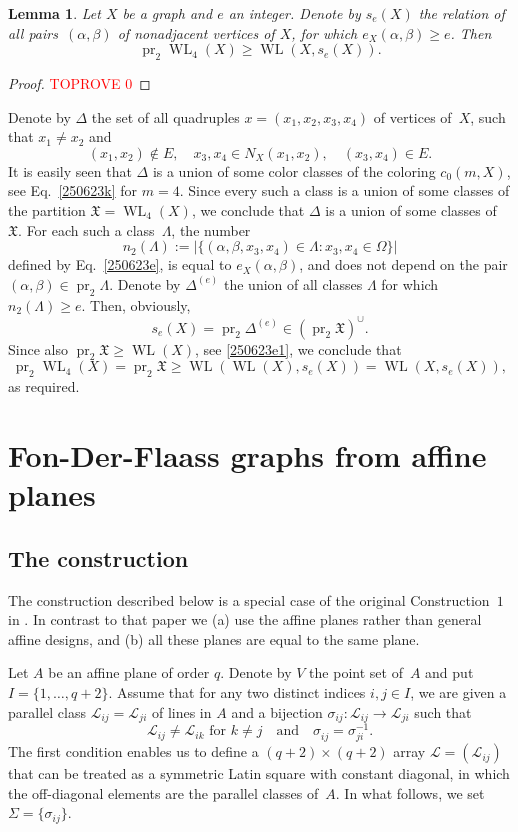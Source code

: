 \documentclass{amsart}
\newcommand{\cal}{\mathcal}
\newtheorem{lemma}[formula]{Lemma}
\def\qtnl#1{\begin{equation}\label{#1}}
\def\eqtn{\end{equation}}
\def\lmml#1{\begin{lemma}\label{#1}}
\def\elmm{\end{lemma}}
\def\prf{\begin{proof}\textcolor{red}{TOPROVE 0}\end{proof}}
\def\cL{{\cal L}}
\def\fX{{\mathfrak X}}
\DeclareMathOperator{\pr}{pr}
\DeclareMathOperator{\WL}{WL}
\def\qaq{\quad\text{and}\quad}
\begin{document}
\lmml{090623b}
Let $X$ be a graph  and $e$ an integer. Denote by $s_e(X)$ the relation  of all pairs~$(\alpha, \beta)$ of nonadjacent vertices of $X$, for which $e_X(\alpha,\beta)\ge e$. Then
$$
\pr_2\WL_4(X)\ge \WL(X, s_e(X)).
$$
\elmm
\prf
Denote by $\Delta$ the set of all quadruples $x=(x_1,x_2,x_3,x_4)$ 
of vertices of~$X$, such that $x_1\ne x_2$ and
$$
(x_1,x_2)\not\in E,\quad x_3,x_4\in N_X(x_1,x_2),\quad (x_3,x_4)\in E.
$$ 
It is easily seen that  $\Delta$ is a union of some color classes of the coloring $c_0(m,X)$, see Eq.~\eqref{250623k} for $m=4$. Since every such a class is a union of  some classes of the partition $\fX=\WL_4(X)$, we conclude that $\Delta$ is a union of some classes of~$\fX$.  For each such a class~$\Lambda$, the number 
$$
n_2(\Lambda):=|\{(\alpha,\beta,x_3,x_4)\in\Lambda\colon x_3,x_4\in\Omega\}|
$$
defined by Eq.~\eqref{250623e}, is equal to $e_X(\alpha,\beta)$, and does not depend on the pair $(\alpha,\beta)\in\pr_2 \Lambda$.  Denote by $\Delta^{(e)}$  the union of all classes $\Lambda$ for which $n_2(\Lambda)\ge e$. Then, obviously,
$$
s_e(X)=\pr_2\Delta^{(e)}\in (\pr_2\fX)^\cup.
$$
Since also  $\pr_2\fX\ge \WL(X)$, see \eqref{250623e1}, we conclude that
$$
\pr_2\WL_4(X)=\pr_2\fX\ge \WL(\WL(X),s_e(X))= \WL(X, s_e(X)),
$$
as required.
\eprf


\section{Fon-Der-Flaass graphs from affine planes }

\subsection{The construction}\label{130623h}
The construction described below is a special case of the original Construction~$1$ in \cite{FonDF2002}. In contrast to that paper we  (a) use the affine planes rather than general affine designs, and (b) all these planes are equal to the same plane. 

Let $A$ be an affine plane of order $q$. Denote by $V$ the point set of~$A$  and put $I=\{1,\ldots,q+2\}$. Assume that  for any two distinct indices  $i,j\in I$, we are given a parallel class $\cL_{ij}=\cL_{ji}$ of lines in $A$ and a bijection  $\sigma_{ij}\colon\cL_{ij}\to \cL_{ji}$ such that
\qtnl{140623a}
\cL_{ij}\ne \cL_{ik}\text{ for } k\ne j \qaq \sigma_{ij}^{}=\sigma_{ji}^{-1}.
\eqtn
The first condition enables us to define a $(q+2)\times (q+2)$ array $\cL=(\cL_{ij})$ that can be treated  as a  symmetric Latin square with constant diagonal, in which the off-diagonal elements  are the parallel classes of~$A$. In what follows, we set $\Sigma=\{\sigma_{ij}\}$.
\end{document}
